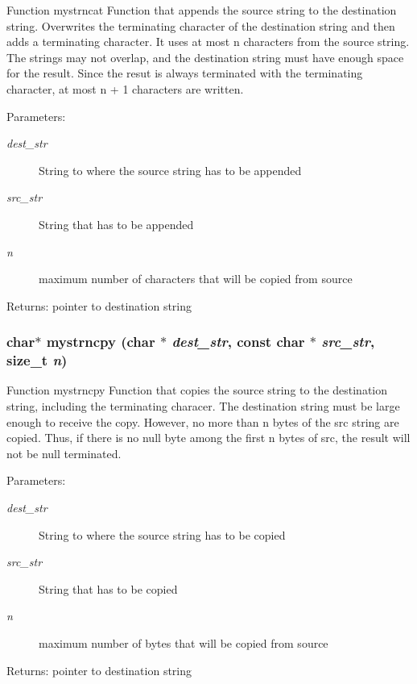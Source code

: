Function mystrncat Function that appends the source string to the destination string. Overwrites the terminating character of the destination string and then adds a terminating character. It uses at most n characters from the source string. The strings may not overlap, and the destination string must have enough space for the result. Since the resut is always terminated with the terminating character, at most n + 1 characters are written. \begin{Desc}
\item[Parameters:]
\begin{description}
\item[{\em dest\_\-str}]String to where the source string has to be appended \item[{\em src\_\-str}]String that has to be appended \item[{\em n}]maximum number of characters that will be copied from source \end{description}
\end{Desc}
\begin{Desc}
\item[Returns:]pointer to destination string \end{Desc}
\subsubsection{\setlength{\rightskip}{0pt plus 5cm}char$\ast$ mystrncpy (char $\ast$ {\em dest\_\-str}, const char $\ast$ {\em src\_\-str}, size\_\-t {\em n})}\label{mystring_8c_cc77072c3a76487c51dba97662cea1d3}


Function mystrncpy Function that copies the source string to the destination string, including the terminating characer. The destination string must be large enough to receive the copy. However, no more than n bytes of the src string are copied. Thus, if there is no null byte among the first n bytes of src, the result will not be null terminated. \begin{Desc}
\item[Parameters:]
\begin{description}
\item[{\em dest\_\-str}]String to where the source string has to be copied \item[{\em src\_\-str}]String that has to be copied \item[{\em n}]maximum number of bytes that will be copied from source \end{description}
\end{Desc}
\begin{Desc}
\item[Returns:]pointer to destination string \end{Desc}
